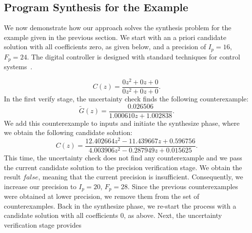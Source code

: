 \documentclass[final]{sig-alternate-05-2015}
\newcommand{\aabatecmt}[1]{}%
\newcommand{\red}[1]{{\color{red}#1}}
\begin{document}
\subsection{Program Synthesis for the Example}
%
We now demonstrate how our approach solves the synthesis problem for the
example given in the previous section.  We start with an a priori candidate solution
with all coefficients zero, as given below, and a precision of $I_p=16$,
$F_p=24$.  The digital controller is designed with standard techniques for
control systems~\cite{Kuo:2002:ACS:579453, Ogata:1987:DCS:26170}. 
\aabatecmt{[Add comment on the next candidate solution - generated automatically, or selected manually?]}
%
%
$$ 
C(z)=\frac{0z^2{+}0z{+}0}{0z^2{+}0z{+}0}. 
$$
In the first {\sc verify} stage, the {\sc uncertainty} 
check finds the following counterexample:
%
$$ 
\tilde G(z) = \frac{0.026506}{1.000610z+1.002838}. 
$$
We add this counterexample to {\sc inputs} and initiate the {\sc synthesize}
phase, where we obtain the following candidate solution:
%
$$
C(z)=\frac{12.402664z^2{-}11.439667z{+}0.596756}{4.003906z^2{-}0.287949z{+}0.015625}. 
$$ 
This time, the {\sc uncertainty} check does not find any
counterexample and we pass the current candidate solution to the {\sc
precision} verification stage.
%
%
We obtain the result $\mathit{false}$, meaning that the current precision is
insufficient.  Consequently, we increase our precision to $I_p=20$, $F_p=28$.
%
Since the previous counterexamples were obtained at lower precision, we
remove them from the set of counterexamples.  Back in the {\sc synthesize}
phase, we re-start the process with a candidate solution with all
coefficients $0$, as above.  Next, the {\sc uncertainty} verification stage provides
\end{document}

